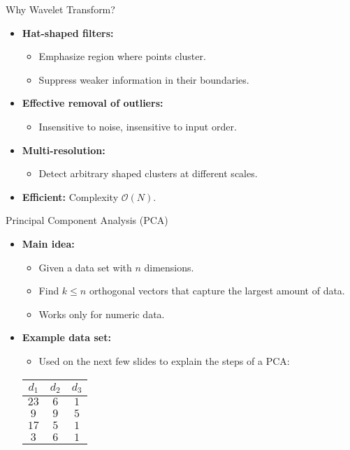 \begin{frame}{Why Wavelet Transform?}
	\begin{itemize}
		\item \textbf{Hat-shaped filters:}
		      \begin{itemize}
			      \item Emphasize region where points cluster.
			      \item Suppress weaker information in their boundaries.
		      \end{itemize}
		\item \textbf{Effective removal of outliers:}
		      \begin{itemize}
			      \item Insensitive to noise, insensitive to input order.
		      \end{itemize}
		\item \textbf{Multi-resolution:}
		      \begin{itemize}
			      \item Detect arbitrary shaped clusters at different scales.
		      \end{itemize}
		\item \textbf{Efficient:} Complexity $\mathcal{O}(N)$.
	\end{itemize}
\end{frame}

\begin{frame}{Principal Component Analysis (PCA)}
	\begin{itemize}
		\item \textbf{Main idea:}
		      \begin{itemize}
			      \item Given a data set with $n$ dimensions.
			      \item Find $k \leq n$ orthogonal vectors that capture the largest
			            amount of data.
			      \item Works only for numeric data.
		      \end{itemize}
		\item \textbf{Example data set:}
		      \begin{itemize}
			      \item Used on the next few slides to explain the steps of a PCA:
		      \end{itemize}
		      \vspace{3mm}
		      \centering
		      \begin{tabular}{|c|c|c|}
			      \hline
			      $d_1$ & $d_2$ & $d_3$
			      \\\hline
			      $23$  & $6$   & $1$
			      \\\hline
			      $9$   & $9$   & $5$
			      \\\hline
			      $17$  & $5$   & $1$
			      \\\hline
			      $3$   & $6$   & $1$
			      \\\hline
		      \end{tabular}
	\end{itemize}
\end{frame}

